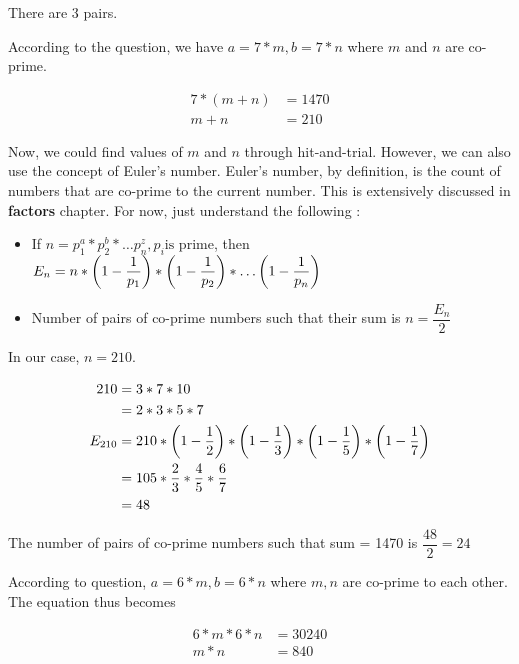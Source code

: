 There are 3 pairs. 


According to the question, we have $a = 7 * m, b = 7 * n$ where $m$ and $n$ are co-prime. 

\begin{align*}
    7 * (m + n) &= 1470 \\
    m + n &= 210
\end{align*}

Now, we could find values of $m$ and $n$ through hit-and-trial. However, we can also use the concept of Euler's number. Euler's number, by definition, is the count of numbers that are co-prime to the current number. This is extensively discussed in \textbf{factors} chapter. For now, just understand the following : 
\begin{itemize}
    \item If $n = p_1^a * p_2^b * \ldots p_n^z, p_i \text{is prime}$, then $E_n = n * \left ( 1 - \dfrac{1}{p_1} \right ) * \left ( 1 - \dfrac{1}{p_2} \right ) * \ldots \left ( 1 - \dfrac{1}{p_n} \right )$ 
    
    \item Number of pairs of co-prime numbers such that their sum is $n = \dfrac{E_n}{2}$ 
\end{itemize}

In our case, $n=210$. 

\begin{align*}
    210 &= 3 * 7 * 10 \\
    &= 2 * 3 * 5 * 7 \\
    E_{210} &= 210 * \left ( 1 - \dfrac{1}{2} \right ) * \left ( 1 - \dfrac{1}{3} \right ) * \left ( 1 - \dfrac{1}{5} \right ) * \left ( 1 - \dfrac{1}{7} \right ) \\
    &= 105 * \dfrac{2}{3} * \dfrac{4}{5} * \dfrac{6}{7} \\
    &= 48
\end{align*}

The number of pairs of co-prime numbers such that sum = 1470 is $\dfrac{48}{2} = 24$


According to question, $a = 6 * m , b = 6 * n$ where $m,n$ are co-prime to each other. The equation thus becomes

\begin{align*}
    6 * m * 6 * n &= 30240 \\
    m * n &= 840
\end{align*}

